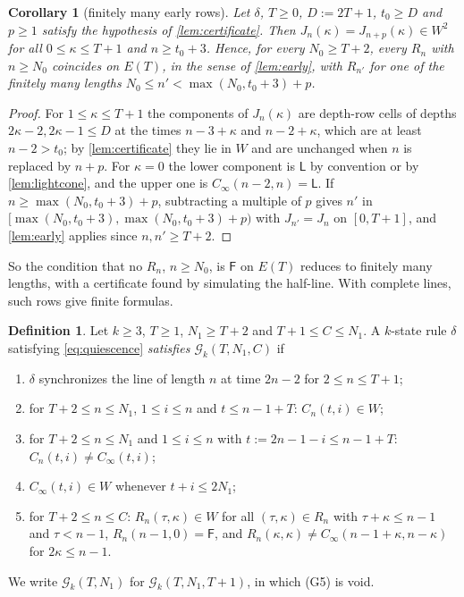 \documentclass[3p]{elsarticle}
\newtheorem{corollary}[theorem]{Corollary}
\theoremstyle{definition}
\newtheorem{definition}[theorem]{Definition}
\newcommand{\Lq}{\mathsf L}
\newcommand{\Fq}{\mathsf F}
\newcommand{\G}{\mathcal G}
\begin{document}
\begin{corollary}[finitely many early rows]\label{cor:reduce}
Let $\delta$, $T\ge0$, $D:=2T+1$, $t_0\ge D$ and $p\ge1$ satisfy the
hypothesis of \cref{lem:certificate}. Then $J_n(\kappa)=J_{n+p}(\kappa)\in
W^2$ for all $0\le\kappa\le T+1$ and $n\ge t_0+3$. Hence, for every $N_0\ge
T+2$, every $R_n$ with $n\ge N_0$ coincides on $E(T)$, in the sense of
\cref{lem:early}, with $R_{n'}$ for one of the finitely many lengths $N_0\le
n'<\max(N_0,t_0+3)+p$.
\end{corollary}

\begin{proof}
For $1\le\kappa\le T+1$ the components of $J_n(\kappa)$ are depth-row cells
of depths $2\kappa-2,2\kappa-1\le D$ at the times $n-3+\kappa$ and
$n-2+\kappa$, which are at least $n-2>t_0$; by \cref{lem:certificate} they lie
in $W$ and are unchanged when $n$ is replaced by $n+p$. For $\kappa=0$ the
lower component is $\Lq$ by convention or by \cref{lem:lightcone}, and the
upper one is $C_\infty(n-2,n)=\Lq$. If $n\ge\max(N_0,t_0+3)+p$, subtracting a
multiple of $p$ gives $n'$ in $[\max(N_0,t_0+3),\max(N_0,t_0+3)+p)$ with
$J_{n'}=J_n$ on $[0,T+1]$, and \cref{lem:early} applies since $n,n'\ge T+2$.
\end{proof}

So the condition that no $R_n$, $n\ge N_0$, is $\Fq$ on $E(T)$ reduces to
finitely many lengths, with a certificate found by simulating the half-line.
With complete lines, such rows give finite formulas.

\begin{definition}\label{def:G}
Let $k\ge3$, $T\ge1$, $N_1\ge T+2$ and $T+1\le C\le N_1$. A $k$-state rule $\delta$
satisfying \eqref{eq:quiescence} \emph{satisfies $\G_k(T,N_1,C)$} if
\begin{enumerate}[(G1)]
\item $\delta$ synchronizes the line of length $n$ at time $2n-2$ for $2\le
n\le T+1$;
\item for $T+2\le n\le N_1$, $1\le i\le n$ and $t\le n-1+T$: $C_n(t,i)\in W$;
\item for $T+2\le n\le N_1$ and $1\le i\le n$ with $t:=2n-1-i\le n-1+T$:
$C_n(t,i)\ne C_\infty(t,i)$;
\item $C_\infty(t,i)\in W$ whenever $t+i\le 2N_1$;
\item for $T+2\le n\le C$: $R_n(\tau,\kappa)\in W$ for all $(\tau,\kappa)\in
R_n$ with $\tau+\kappa\le n-1$ and $\tau<n-1$, $R_n(n-1,0)=\Fq$, and
$R_n(\kappa,\kappa)\ne C_\infty(n-1+\kappa,n-\kappa)$ for $2\kappa\le n-1$.
\end{enumerate}
We write $\G_k(T,N_1)$ for $\G_k(T,N_1,T+1)$, in which (G5) is void.
\end{definition}
\end{document}
